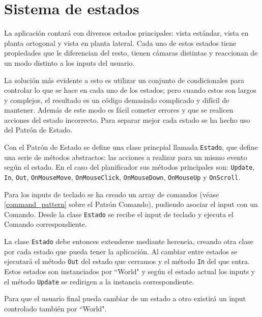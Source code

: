 \section{Sistema de estados}
\label{state_pattern}
La aplicación contará con diversos estados principales: vista estándar, vista en planta ortogonal y vista en planta lateral. Cada uno de estos estados tiene propiedades que le diferencian del resto, tienen cámaras distintas y reaccionan de un modo distinto a los inputs del usuario.

La solución más evidente a esto es utilizar un conjunto de condicionales para controlar lo que se hace en cada uno de los estados; pero cuando estos son largos y complejos, el resultado es un código demasiado complicado y difícil de mantener. Además de este modo es fácil cometer errores y que se realicen acciones del estado incorrecto. Para separar mejor cada estado se ha hecho uso del Patrón de Estado.

Con el Patrón de Estado se define una clase princpial llamada \texttt{Estado}, que define una serie de métodos abstractos: las acciones a realizar para un mismo evento según el estado. En el caso del planificador sus métodos principales son: \texttt{Update}, \texttt{In}, \texttt{Out}, \texttt{OnMouseMove}, \texttt{OnMouseClick}, \texttt{OnMouseDown}, \texttt{OnMouseUp} y \texttt{OnScroll}.

Para los inputs de teclado se ha creado un array de comandos (véase \ref{command_pattern} sobre el Patrón Comando), pudiendo asociar el input con un Comando. Desde la clase \texttt{Estado} se recibe el input de teclado y ejecuta el Comando correspondiente.

La clase \texttt{Estado} debe entonces extenderse mediante herencia, creando otra clase por cada estado que pueda tener la aplicación. Al cambiar entre estados se ejecutará el método \texttt{Out} del estado que cerramos y el método \texttt{In} del que entra. Estos estados son instanciados por ``World" y según el estado actual los inputs y el método \texttt{Update} se redirigen a la instancia correspondiente.

Para que el usuario final pueda cambiar de un estado a otro existirá un input controlado también por ``World".


